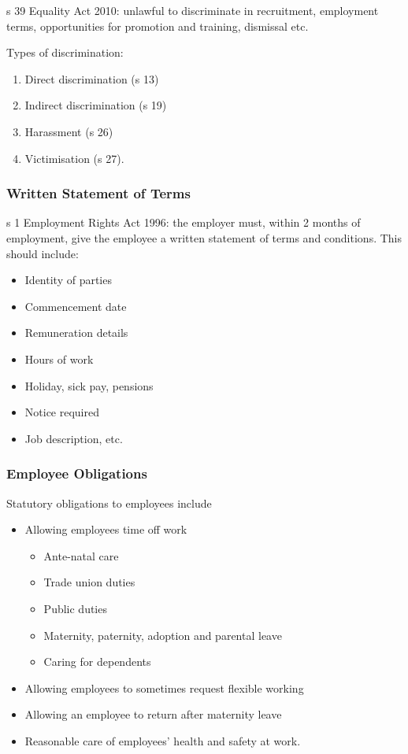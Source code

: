 \documentclass[
]{article}
\providecommand{\tightlist}{%
  \setlength{\itemsep}{0pt}\setlength{\parskip}{0pt}}
\begin{document}
s 39 Equality Act 2010: unlawful to discriminate in recruitment,
employment terms, opportunities for promotion and training, dismissal
etc.

Types of discrimination:

\begin{enumerate}
\def\labelenumi{\arabic{enumi}.}
\tightlist
\item
  Direct discrimination (s 13)
\item
  Indirect discrimination (s 19)
\item
  Harassment (s 26)
\item
  Victimisation (s 27).
\end{enumerate}

\hypertarget{written-statement-of-terms}{%
\subsubsection{Written Statement of
Terms}\label{written-statement-of-terms}}

s 1 Employment Rights Act 1996: the employer must, within 2 months of
employment, give the employee a written statement of terms and
conditions. This should include:

\begin{itemize}
\tightlist
\item
  Identity of parties
\item
  Commencement date
\item
  Remuneration details
\item
  Hours of work
\item
  Holiday, sick pay, pensions
\item
  Notice required
\item
  Job description, etc.
\end{itemize}

\hypertarget{employee-obligations}{%
\subsubsection{Employee Obligations}\label{employee-obligations}}

Statutory obligations to employees include

\begin{itemize}
\tightlist
\item
  Allowing employees time off work

  \begin{itemize}
  \tightlist
  \item
    Ante-natal care
  \item
    Trade union duties
  \item
    Public duties
  \item
    Maternity, paternity, adoption and parental leave
  \item
    Caring for dependents
  \end{itemize}
\item
  Allowing employees to sometimes request flexible working
\item
  Allowing an employee to return after maternity leave
\item
  Reasonable care of employees' health and safety at work.
\end{itemize}
\end{document}
